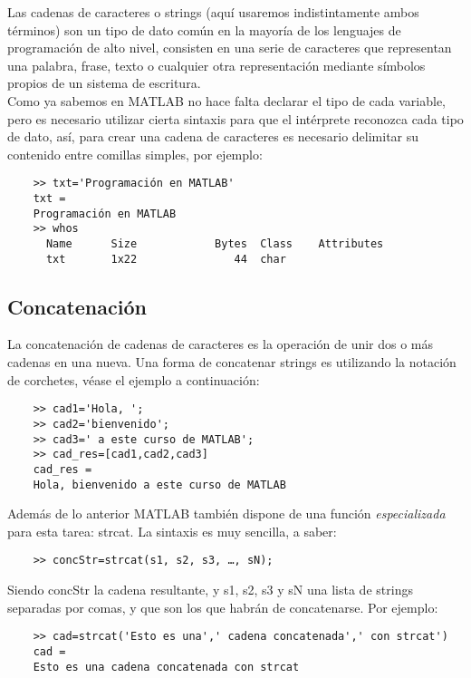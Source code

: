 Las cadenas de caracteres o strings (aquí usaremos indistintamente ambos términos) son un tipo 
de dato común en la mayoría de los lenguajes de programación de alto nivel, consisten en una 
serie de caracteres que representan una palabra, frase, texto o cualquier otra representación 
mediante símbolos propios de un sistema de escritura.\\

Como ya sabemos en MATLAB no hace falta declarar el tipo de cada variable, pero es necesario 
utilizar cierta sintaxis para que el intérprete reconozca cada tipo de dato, así, para crear 
una cadena de caracteres es necesario delimitar su contenido entre comillas simples, por ejemplo:

\begin{verbatim}
	>> txt='Programación en MATLAB'
	txt =
	Programación en MATLAB
	>> whos
	  Name      Size            Bytes  Class    Attributes
	  txt       1x22               44  char    
\end{verbatim}

\subsection{Concatenación}

La concatenación de cadenas de caracteres es la operación de unir dos o más cadenas en una nueva. 
Una forma de concatenar strings es utilizando la notación de corchetes, véase el ejemplo a continuación:

\begin{verbatim}
	>> cad1='Hola, ';
	>> cad2='bienvenido';
	>> cad3=' a este curso de MATLAB';
	>> cad_res=[cad1,cad2,cad3]
	cad_res =
	Hola, bienvenido a este curso de MATLAB
\end{verbatim}

Además de lo anterior MATLAB también dispone de una función \textit{especializada}  para esta tarea: 
strcat. La sintaxis es muy sencilla, a saber:

\begin{verbatim}
	>> concStr=strcat(s1, s2, s3, …, sN);
\end{verbatim}

Siendo concStr la cadena resultante, y s1, s2, s3 y sN una lista de strings separadas por comas, 
y que son los que habrán de concatenarse. Por ejemplo:

\begin{verbatim}
	>> cad=strcat('Esto es una',' cadena concatenada',' con strcat')
	cad =
	Esto es una cadena concatenada con strcat
\end{verbatim}


